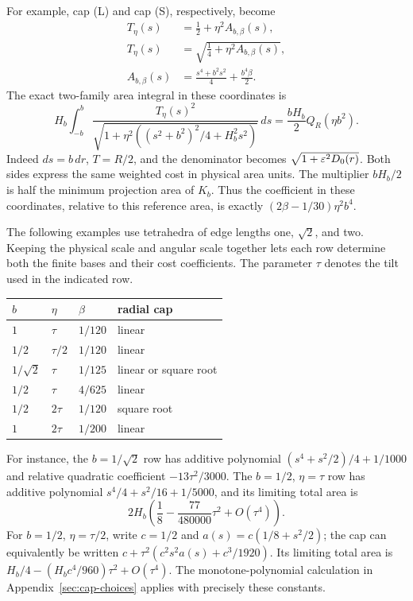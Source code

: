 For example, cap (L) and cap (S), respectively, become
\begin{align}
 T_\eta(s)&=\frac12+\eta^2 A_{b,\beta}(s),\label{eq:scaled-linear-cap}\\
 T_\eta(s)&=\sqrt{\frac14+\eta^2 A_{b,\beta}(s)},\label{eq:scaled-square-cap}\\
 A_{b,\beta}(s)&=\frac{s^4+b^2s^2}{4}+\frac{b^4\beta}{2}.
 \nonumber
\end{align}
The exact two-family area integral in these coordinates is
\begin{equation}\label{eq:scaled-cost-identity}
 H_b\int_{-b}^b
 \frac{T_\eta(s)^2}{\sqrt{1+\eta^2((s^2+b^2)^2/4+H_b^2s^2)}}\,ds
 =\frac{bH_b}{2}Q_R(\eta b^2).
\end{equation}
Indeed $ds=b\,dr$, $T=R/2$, and the denominator becomes
$\sqrt{1+\varepsilon^2D_0(r)}$. Both sides express the same weighted cost in physical area units. The multiplier $bH_b/2$ is half the minimum projection area
of $K_b$. Thus the coefficient in these coordinates, relative to this
reference area, is exactly $(2\beta-1/30)\eta^2b^4$.

The following examples use tetrahedra of edge lengths one, $\sqrt2$,
and two. Keeping the physical scale and angular scale together lets
each row determine both the finite bases and their cost coefficients.
The parameter $\tau$ denotes the tilt used in the indicated row.
\begin{center}
\begin{tabular}{llll}
$b$ & $\eta$ & $\beta$ & radial cap\\ \hline
$1$ & $\tau$ & $1/120$ & linear\\
$1/2$ & $\tau/2$ & $1/120$ & linear\\
$1/\sqrt2$ & $\tau$ & $1/125$ & linear or square root\\
$1/2$ & $\tau$ & $4/625$ & linear\\
$1/2$ & $2\tau$ & $1/120$ & square root\\
$1$ & $2\tau$ & $1/200$ & linear
\end{tabular}
\end{center}
For instance, the $b=1/\sqrt2$ row has additive polynomial
$(s^4+s^2/2)/4+1/1000$ and relative quadratic coefficient
$-13\tau^2/3000$. The $b=1/2$, $\eta=\tau$ row has additive
polynomial $s^4/4+s^2/16+1/5000$, and its limiting total area is
\[
 2H_b\left(\frac18-\frac{77}{480000}\tau^2+O(\tau^4)\right).
\]
For $b=1/2$, $\eta=\tau/2$, write $c=1/2$ and
$a(s)=c(1/8+s^2/2)$; the cap can equivalently be written
$c+\tau^2(c^2s^2a(s)+c^3/1920)$. Its limiting total area is
$H_b/4-(H_bc^4/960)\tau^2+O(\tau^4)$.
The monotone-polynomial calculation in
Appendix~\ref{sec:cap-choices} applies with precisely these constants.

